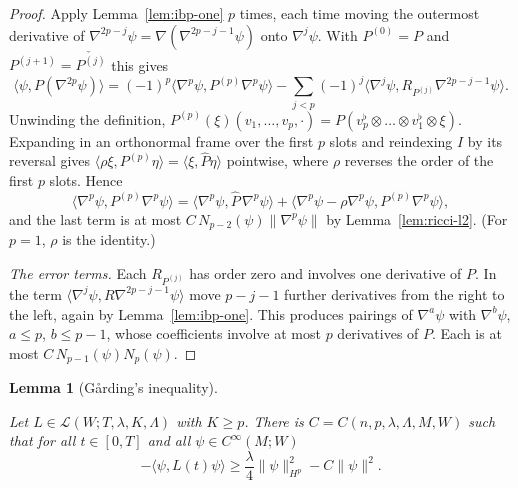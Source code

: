 \documentclass[11pt,reqno]{amsart}
\newtheorem{lemma}[theorem]{Lemma}
\theoremstyle{definition}
\theoremstyle{remark}
\newcommand{\Lcl}{\mathcal{L}}
\newcommand{\ip}[2]{\langle #1,#2\rangle}
\newcommand{\norm}[1]{\lVert #1\rVert}
\newcommand{\hatP}{\widehat{P}}
\newcommand{\lean}[1]{}
\newcommand{\uses}[1]{}
\numberwithin{equation}{section}
\begin{document}
\begin{proof}
\uses{lem:ricci-l2}
Apply Lemma~\ref{lem:ibp-one} $p$ times, each time moving the outermost derivative of
$\nabla^{2p-j}\psi=\nabla(\nabla^{2p-j-1}\psi)$ onto $\nabla^j\psi$. With $P^{(0)}=P$ and
$P^{(j+1)}=\check{P^{(j)}}$ this gives
\[
  \ip{\psi}{P(\nabla^{2p}\psi)}=(-1)^p\ip{\nabla^p\psi}{P^{(p)}\nabla^p\psi}
  -\sum_{j<p}(-1)^j\ip{\nabla^j\psi}{R_{P^{(j)}}\nabla^{2p-j-1}\psi}.
\]
Unwinding the definition, $P^{(p)}(\xi)(v_1,\dots,v_p,\cdot)=P(v_p^\flat\otimes\dots\otimes v_1^\flat
\otimes\xi)$. Expanding in an orthonormal frame over the first $p$ slots and reindexing $I$ by its
reversal gives $\ip{\rho\xi}{P^{(p)}\eta}=\ip{\xi}{\hatP\eta}$ pointwise, where $\rho$ reverses the
order of the first $p$ slots. Hence
\[
  \ip{\nabla^p\psi}{P^{(p)}\nabla^p\psi}=\ip{\nabla^p\psi}{\hatP\,\nabla^p\psi}
  +\ip{\nabla^p\psi-\rho\nabla^p\psi}{P^{(p)}\nabla^p\psi},
\]
and the last term is at most $C\,N_{p-2}(\psi)\norm{\nabla^p\psi}$ by Lemma~\ref{lem:ricci-l2}. (For
$p=1$, $\rho$ is the identity.)

\emph{The error terms.} Each $R_{P^{(j)}}$ has order zero and involves one derivative of $P$. In the
term $\ip{\nabla^j\psi}{R\nabla^{2p-j-1}\psi}$ move $p-j-1$ further derivatives from the right to
the left, again by Lemma~\ref{lem:ibp-one}. This produces pairings of $\nabla^a\psi$ with
$\nabla^b\psi$, $a\le p$, $b\le p-1$, whose coefficients involve at most $p$ derivatives of $P$.
Each is at most $C\,N_{p-1}(\psi)N_p(\psi)$.
\end{proof}

\begin{lemma}[G\aa rding's inequality]\label{lem:garding}
\lean{ShortTime.LinearOp.garding, ShortTime.LinearOp.garding_top, ShortTime.LinearOp.coercive}
\uses{def:class, def:sobolev}
Let $L\in\Lcl(W;T,\lambda,K,\Lambda)$ with $K\ge p$. There is $C=C(n,p,\lambda,\Lambda,M,W)$ such that
for all $t\in[0,T]$ and all $\psi\in C^\infty(M;W)$
\[
  -\ip{\psi}{L(t)\psi}\ge\frac\lambda4\norm\psi_{H^p}^2-C\norm\psi^2 .
\]
\end{lemma}
\end{document}
